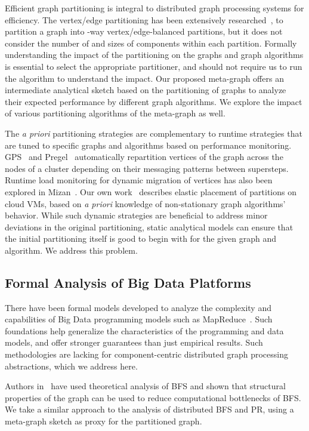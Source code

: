 \documentclass[10pt,conference, compsocconf]{IEEEtran}
\begin{document}
Efficient graph partitioning is integral to distributed graph processing systems for efficiency. 
The vertex/edge partitioning has been extensively researched~\cite{metis,scotch,bourse2014balanced}, to partition a graph into -way vertex/edge-balanced partitions, but it does not consider the number of and sizes of components within each partition. Formally understanding the impact of the partitioning on the graphs and graph algorithms is essential to select the appropriate partitioner, and should not require us to run the algorithm to understand the impact. Our proposed meta-graph offers an intermediate analytical sketch based on the partitioning of graphs to analyze their expected performance by different graph algorithms. We explore the impact of various partitioning algorithms of the meta-graph as well.
  
The \emph{a priori} partitioning strategies are complementary to runtime strategies that are tuned to specific graphs and algorithms based on performance monitoring. GPS~\cite{gps} and Pregel~\cite{pregel} automatically repartition vertices of the graph across the nodes of a cluster depending on their messaging patterns between supersteps. Runtime load monitoring for dynamic migration of vertices has also been explored in Mizan~\cite{mizan}. Our own work~\cite{ccgrid} describes elastic placement of partitions on cloud VMs, based on \emph{a priori} knowledge of non-stationary graph algorithms' behavior. While such dynamic strategies are beneficial to address minor deviations in the original partitioning, static analytical models can ensure that the initial partitioning itself is good to begin with for the given graph and algorithm. We address this problem.

\subsection{Formal Analysis of Big Data Platforms} 
There have been formal models developed to analyze the complexity and capabilities of Big Data programming models such as MapReduce~\cite{karloff2010model,sarma2013upper}. Such foundations help generalize the characteristics of the programming and data models, and offer stronger guarantees than just empirical results. Such methodologies are lacking for component-centric distributed graph processing abstractions, which we address here.

Authors in~\cite{fay2016predictive} have used theoretical analysis of BFS and shown that structural properties of the graph can be used to reduce computational bottlenecks of BFS. We take a similar approach to the analysis of distributed BFS and PR, using a meta-graph sketch as proxy for the partitioned graph.
\end{document}
